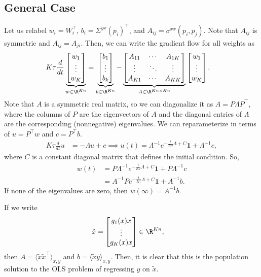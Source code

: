 \documentclass{article}
\begin{document}
\subsection{General Case}
Let us relabel $w_i = W_i^\top$, $b_i = \Sigma^{yx}(p_i)^\top$, and $A_{ij} = \sigma^{xx}(p_i,p_j)$.
Note that $A_{ij}$ is symmetric and $A_{ij} = A_{ji}$.
Then, we can write the gradient flow for all weights as
\begin{align}
  K \tau \frac{d}{dt} \underbrace{\begin{bmatrix} w_1 \\ \vdots \\ w_K \end{bmatrix}}_{w \in \R^{Kn}}
  &= \underbrace{\begin{bmatrix} b_1 \\ \vdots \\ b_k \end{bmatrix}}_{b \in \R^{Kn}} - \underbrace{\begin{bmatrix} A_{11} & \cdots & A_{1K} \\ \vdots & \ddots & \vdots \\ A_{K1} & \cdots & A_{KK} \end{bmatrix}}_{A \in \R^{Kn \times Kn}} \begin{bmatrix} w_1 \\ \vdots \\ w_K \end{bmatrix}.
\end{align}
Note that $A$ is a symmetric real matrix, so we can diagonalize it as $A = P \Lambda P^\top$, where the columns of $P$ are the eigenvectors of $A$ and the diagonal entries of $\Lambda$ are the corresponding (nonnegative) eigenvalues.
We can reparameterize in terms of $u = P^\top w$ and $c = P^\top b$.
\begin{align}
  K \tau \frac{d}{dt} u &= - \Lambda u + c
  \implies
  u(t) = \Lambda^{-1} e^{ -\frac{t}{K \tau} \Lambda + C } \mathbf{1} + \Lambda^{-1} c,
\end{align}
where $C$ is a constant diagonal matrix that defines the initial condition.
So,
\begin{align}
  w(t) 
  &= P \Lambda^{-1} e^{ -\frac{t}{K \tau} \Lambda + C } \mathbf{1} + P \Lambda^{-1} c \\
  &= A^{-1} P e^{ -\frac{t}{K \tau} \Lambda + C } \mathbf{1} + A^{-1} b.
\end{align}
If none of the eigenvalues are zero, then $w(\infty) = A^{-1} b$.

If we write
\begin{align}
  \tilde{x} &= \begin{bmatrix} g_1(x) x \\ \vdots \\ g_K(x) x \end{bmatrix} \in \R^{Kn},
\end{align}
then $A = \langle \tilde{x} \tilde{x}^\top \rangle_{x,y}$ and $b = \langle \tilde{x} y \rangle_{x,y}$.
Then, it is clear that this is the population solution to the OLS problem of regressing $y$ on $\tilde{x}$.
\end{document}
